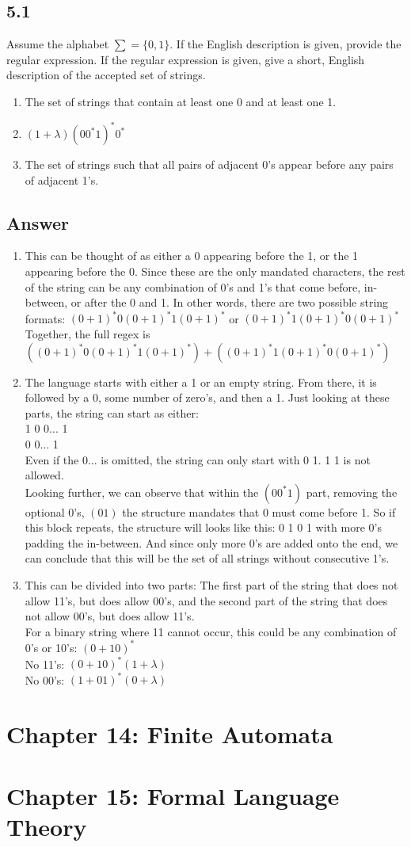\documentclass{article}
\begin{document}
\subsection*{5.1}
Assume the alphabet $\sum=\{0,1\}$. If the English description is given, provide the regular expression. If the regular expression is given, give a short, English description of the accepted set of strings.
\begin{enumerate}[label=\alph*.]
    \item The set of strings that contain at least one 0 and at least one 1.
    \item $(1+\lambda)(00^*1)^*0^*$
    \item The set of strings such that all pairs of adjacent 0's appear before any pairs of adjacent 1's.
\end{enumerate}
\subsection*{Answer}
\begin{enumerate}[label=\alph*.]
    \item This can be thought of as either a 0 appearing before the 1, or the 1 appearing before the 0. Since these are the only mandated characters, the rest of the string can be any combination of 0's and 1's that come before, in-between, or after the 0 and 1. In other words, there are two possible string formats: $(0+1)^*0(0+1)^*1(0+1)^*$ or $(0+1)^*1(0+1)^*0(0+1)^*$
    \\ Together, the full regex is $((0+1)^*0(0+1)^*1(0+1)^*)+((0+1)^*1(0+1)^*0(0+1)^*)$
    \item The language starts with either a 1 or an empty string. From there, it is followed by a 0, some number of zero's, and then a 1. Just looking at these parts, the string can start as either:
    \\ 1 0 0... 1 
    \\ 0 0... 1
    \\ Even if the 0... is omitted, the string can only start with 0 1. 1 1 is not allowed.
    \\ Looking further, we can observe that within the $(00^*1)$ part, removing the optional 0's, $(01)$ the structure mandates that 0 must come before 1. So if this block repeats, the structure will looks like this: 0 1 0 1 with more 0's padding the in-between. And since only more 0's are added onto the end, we can conclude that this will be the set of all strings without consecutive 1's.
    \item This can be divided into two parts: The first part of the string that does not allow 11's, but does allow 00's, and the second part of the string that does not allow 00's, but does allow 11's.
    \\ For a binary string where 11 cannot occur, this could be any combination of 0's or 10's: $(0+10)^*$
    \\ No 11's: $(0+10)^*(1+\lambda)$
    \\ No 00's: $(1+01)^*(0+\lambda)$
\end{enumerate}
\newpage
\section*{Chapter 14: Finite Automata}
\newpage
\section*{Chapter 15: Formal Language Theory}
\end{document}
